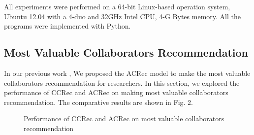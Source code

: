 \documentclass[review]{elsarticle}
\begin{document}
All experiments were performed on a 64-bit Linux-based operation system, Ubuntu 12.04 with a 4-duo and 32GHz Intel CPU, 4-G Bytes memory. All the programs were implemented with Python.

\subsection{Most Valuable Collaborators Recommendation}
In our previous work \cite{li2014acrec}, We proposed the ACRec model to make the most valuable collaborators recommendation for researchers. In this section, we explored the performance of CCRec and ACRec on making most valuable collaborators recommendation. The comparative results are shown in Fig. 2.

\begin{figure}
\centering
{}
\caption{Performance of CCRec and ACRec on most valuable collaborators recommendation}
\label{fig:2}
\end{figure}
\end{document}
